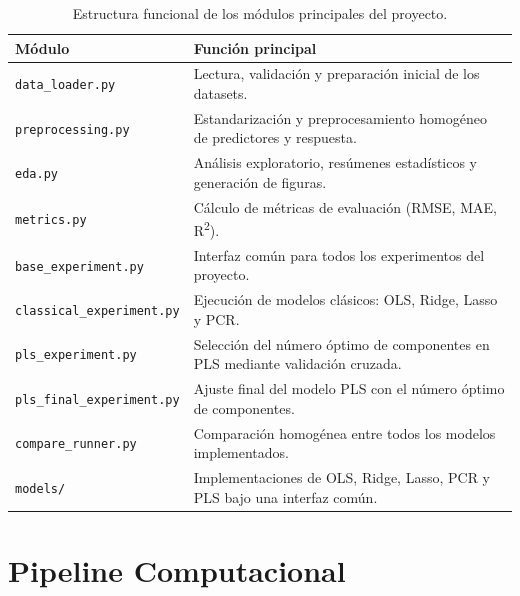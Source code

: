 \documentclass[12pt,a4paper]{report}
\begin{document}
\begin{table}[H]
\centering
\small
\caption{Estructura funcional de los módulos principales del proyecto.}
\label{tabla:modulos}
\begin{tabular}{|p{5cm}|p{10cm}|}
\hline
\textbf{Módulo} & \textbf{Función principal} \\
\hline \hline

\texttt{data\_loader.py} &
Lectura, validación y preparación inicial de los datasets. \\
\hline

\texttt{preprocessing.py} &
Estandarización y preprocesamiento homogéneo de predictores y respuesta. \\
\hline

\texttt{eda.py} &
Análisis exploratorio, resúmenes estadísticos y generación de figuras. \\
\hline

\texttt{metrics.py} &
Cálculo de métricas de evaluación (RMSE, MAE, R\textsuperscript{2}). \\
\hline

\texttt{base\_experiment.py} &
Interfaz común para todos los experimentos del proyecto. \\
\hline

\texttt{classical\_experiment.py} &
Ejecución de modelos clásicos: OLS, Ridge, Lasso y PCR. \\
\hline

\texttt{pls\_experiment.py} &
Selección del número óptimo de componentes en PLS mediante validación cruzada. \\
\hline

\texttt{pls\_final\_experiment.py} &
Ajuste final del modelo PLS con el número óptimo de componentes. \\
\hline

\texttt{compare\_runner.py} &
Comparación homogénea entre todos los modelos implementados. \\
\hline

\texttt{models/} &
Implementaciones de OLS, Ridge, Lasso, PCR y PLS bajo una interfaz común. \\
\hline

\end{tabular}

\end{table}



\section{Pipeline Computacional}
\end{document}
